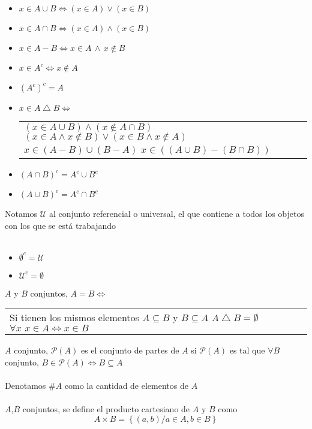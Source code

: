 \documentclass[a4paper,10pt]{article}
\begin{document}
\begin{itemize}
	\item $x \in A \cup B \Leftrightarrow (x \in A) \vee (x \in B)$
	\item $x \in A \cap B \Leftrightarrow (x \in A) \wedge (x \in B)$
	\item $x \in A - B \Leftrightarrow x \in A \, \wedge \, x \not \in B$
	\item $x \in A^c \Leftrightarrow x \not \in A$
	\item ${(A^c)}^c = A$
	\item $x \in A \bigtriangleup B \Leftrightarrow $ 
		\begin{tabular}{l}
			$(x \in A \cup B) \wedge (x \not \in A \cap B)$
			\cr $(x \in A \wedge x \not \in B) \vee (x \in B \wedge x \not \in A)$
			\cr $x \in (A - B) \cup (B - A)$
			\cr $x \in ((A \cup B) - (B \cap B))$
		\end{tabular}
	\item ${(A \cap B)}^{c} = A^c \cup B^c$
	\item ${(A \cup B)}^{c} = A^c \cap B^c$
\end{itemize}
\notacion Notamos $\mathcal{U}$ al conjunto referencial o universal, el que contiene a todos los objetos con los que se está trabajando \\ \\
\propiedades
\begin{itemize}
	\item $\emptyset ^ c = \mathcal{U}$
	\item $\mathcal{U}^c = \emptyset$
\end{itemize}

 $A$ y $B$ conjuntos, $A = B \Leftrightarrow $ 
	\begin{tabular}{l}
		Si tienen los mismos elementos
		\cr $A \subseteq B$ y $B \subseteq A$
		\cr $A \bigtriangleup B = \emptyset$
		\cr $\forall x \, \, x \in A \Leftrightarrow x \in B$
	\end{tabular}

 $A$ conjunto, $\mathcal{P}(A)$ es el conjunto de partes de $A$ si $\mathcal{P}(A)$ es tal que $\forall B$ conjunto, $B \in \mathcal{P}(A) \Leftrightarrow B \subseteq A$ \\ \\
 Denotamos $\#A$ como la cantidad de elementos de $A$ \\ \\
 $A$,$B$ conjuntos, se define el producto cartesiano de $A$ y $B$ como
$$ A \times B = \left \{ (a,b) / {a \in A, b \in B} \right \} $$
\end{document}
